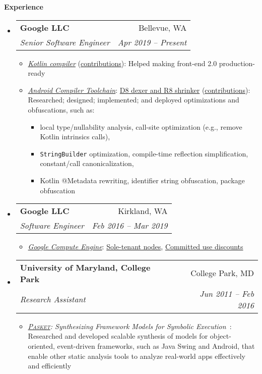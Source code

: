 \documentclass[letterpaper,11pt]{article}
\makeatletter
\newcommand{\resheading}[1]{{\large \colorbox{mygrey}{\begin{minipage}{\textwidth}{\textbf{#1 \vphantom{p\^{E}}}}\end{minipage}}}}
\newcommand{\ressubheading}[4]{
\begin{tabular*}{6.5in}{l@{\extracolsep{\fill}}r}
    \textbf{#1} & #2 \\
    \textit{#3} & \textit{#4} \\
\end{tabular*}\vspace{-6pt}}
\makeatother
\begin{document}
\resheading{Experience}
  \begin{itemize}
    \item
      \ressubheading{{Google LLC}}{Bellevue, WA}{Senior Software Engineer}{Apr 2019 -- Present}
        {
\small
        \begin{itemize}
\item\emph{\href{https://github.com/JetBrains/kotlin}{Kotlin compiler}} (\href{https://github.com/JetBrains/kotlin/commits?author=jsjeon}{\underline{contributions}}):
Helped making front-end 2.0 production-ready
\item\emph{\href{https://developer.android.com/studio/preview/index.html}{Android Compiler Toolchain}}:
\href{https://r8.googlesource.com/r8}{D8 dexer and R8 shrinker} (\href{https://r8-review.googlesource.com/q/author:jsjeon+status:merged}{\underline{contributions}}):
Researched; designed; implemented; and deployed optimizations and obfuscations, such as:
\begin{itemize}
\item local type/nullability analysis, call-site optimization (e.g., remove Kotlin intrinsics calls),
\item \texttt{StringBuilder} optimization, compile-time reflection simplification, constant/call canonicalization,
\item Kotlin @Metadata rewriting, identifier string obfuscation, package obfuscation
\end{itemize}
        \end{itemize}
        }
    \item
      \ressubheading{{Google LLC}}{Kirkland, WA}{Software Engineer}{Feb 2016 -- Mar 2019}
        {
\small
        \begin{itemize}
\item\emph{\href{https://cloud.google.com/compute/}{Google Compute Engine}}:
\href{https://cloudplatform.googleblog.com/2018/06/Introducing-sole-tenant-nodes-for-Google-Compute-Engine.html}{Sole-tenant nodes},
\href{https://cloudplatform.googleblog.com/2017/09/committed-use-discounts-for-Google-Compute-Engine-now-generally-available.html}{Committed use discounts}
        \end{itemize}
        }
    \item
      \ressubheading{{University of Maryland, College Park}}{College Park, MD}{Research Assistant}{Jun 2011 -- Feb 2016}
        {
\small
        \begin{itemize}
\item\emph{\href{https://github.com/plum-umd/pasket}{\textsc{Pasket}}: Synthesizing Framework Models for Symbolic Execution}~\cite{FMSD17, icse16, fse15, cav15}: %
Researched and developed scalable synthesis of models for object-oriented,
event-driven frameworks, such as Java Swing and Android,
that enable other static analysis tools
to analyze real-world apps effectively and efficiently


\end{itemize}}
\end{itemize}
\end{document}
